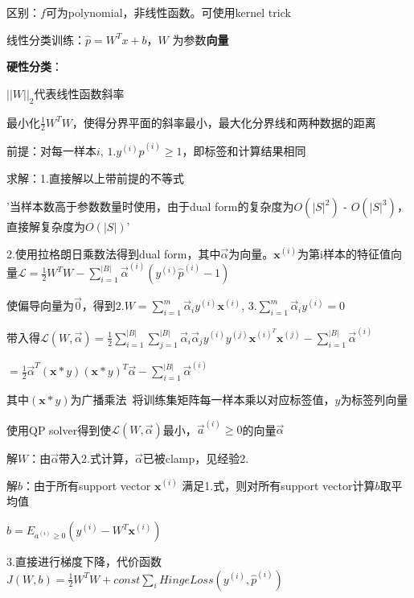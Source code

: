 \documentclass[UTF8]{ctexart}
\begin{document}
  \quad 区别：$f$可为polynomial，非线性函数。可使用kernel trick

  线性分类训练：$\hat{p} = W^Tx + b$，$W$ 为参数\textbf{向量}

  \quad \textbf{硬性分类}：

  \quad \quad $||W||_2$代表线性函数斜率

  \quad \quad 最小化$\frac{1}{2}W^TW$，使得分界平面的斜率最小，最大化分界线和两种数据的距离

  \quad \quad 前提：对每一样本$i$, $1.y^{(i)}\hat{p}^{(i)} \geq 1$，即标签和计算结果相同

  \quad \quad 求解：1.直接解以上带前提的不等式

  \quad \quad \quad '当样本数高于参数数量时使用，由于dual form的复杂度为$O(|S|^2)$ - $O(|S|^3)$，直接解复杂度为$O(|S|)$'
  
  \quad \quad 2.使用拉格朗日乘数法得到dual form，其中$\vec{\alpha}$为向量。$\mathbf{x}^{(i)}$为第i样本的特征值向量$\mathcal{L} = \frac{1}{2}W^TW - \sum_{i=1}^{|B|}\vec{\alpha}^{(i)}(y^{(i)}\hat{p}^{(i)} - 1)$

  \quad \quad \quad 使偏导向量为$\vec{0} $，得到$2.W = \sum_{i=1}^{m}\vec{\alpha}_iy^{(i)}\mathbf{x}^{(i)}$, $3.\sum_{i=1}^{m}\vec{\alpha}_iy^{(i)}=0$

  \quad \quad \quad 带入得$\mathcal{L} (W, \vec{\alpha}) = \frac{1}{2}\sum_{i=1}^{|B|}\sum_{j=1}^{|B|}\vec{\alpha}_i\vec{\alpha}_jy^{(i)}y^{(j)}\mathbf{x}^{(i)^T}\mathbf{x}^{(j)} - \sum_{i=1}^{|B|}\vec{\alpha}^{(i)}$
  
  \quad \quad \quad \quad $=\frac{1}{2}\vec{\alpha}^T (\mathbf{x} * y)(\mathbf{x} * y)^T \vec{\alpha} - \sum_{i=1}^{|B|}\vec{\alpha}^{(i)}$

  \quad \quad \quad \quad 其中$(\mathbf{x} * y)$为广播乘法\ 将训练集矩阵每一样本乘以对应标签值，$y$为标签列向量

  \quad \quad \quad 使用QP solver得到使$\mathcal{L} (W, \vec{\alpha})$最小，$\vec{a}^{(i)} \geq 0$的向量$\vec{\alpha}$

  \quad \quad \quad 解$W$：由$\vec{\alpha}$带入2.式计算，$\vec{\alpha}$已被clamp，见经验2.

  \quad \quad \quad 解$b$：由于所有support vector $\mathbf{x}^{(i)}$ 满足1.式，则对所有support vector计算$b$取平均值

  \quad \quad \quad \quad $b = E_{a^{(i)} \geq 0}(y^{(i)}-W^T\mathbf{x}^{(i)})$

  \quad \quad 3.直接进行梯度下降，代价函数$J(W, b) = \frac{1}{2}W^TW + const \sum_i HingeLoss(y^{(i)}, \hat{p}^{(i)})$
  
\end{document}

